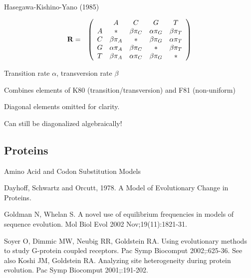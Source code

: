 \documentclass{beamer}
\begin{document}
\begin{frame}{Hasegawa-Kishino-Yano (1985)}

\begin{eqnarray*}
{\bf R} & = & \left( \begin{array}{ccccc}
& A & C & G & T \\
A & \ast & \beta \pi_C & \alpha \pi_G & \beta \pi_T \\
C & \beta \pi_A & \ast & \beta \pi_G & \alpha \pi_T \\
G & \alpha \pi_A & \beta \pi_C & \ast & \beta \pi_T \\
T & \beta \pi_A & \alpha \pi_C & \beta \pi_G & \ast
\end{array} \right)
\end{eqnarray*}

Transition rate $\alpha$, transversion rate $\beta$

Combines elements of K80 (transition/transversion) and F81 (non-uniform)

Diagonal elements omitted for clarity.

Can still be diagonalized algebraically!

\end{frame}


\subsection{Proteins}

\begin{frame}{Amino Acid and Codon Substitution Models}

\enumb
\item Dayhoff, Schwartz and Orcutt, 1978. A Model of Evolutionary Change in Proteins.
\item Goldman N, Whelan S.  A novel use of equilibrium frequencies in models of sequence evolution.  Mol Biol Evol 2002 Nov;19(11):1821-31.
\item Soyer O, Dimmic MW, Neubig RR, Goldstein RA.  Using evolutionary methods to study G-protein coupled receptors.  Pac Symp Biocomput 2002;:625-36.
See also Koshi JM, Goldstein RA.  Analyzing site heterogeneity during protein evolution.  Pac Symp Biocomput 2001;:191-202.
\enume

\end{frame}
\end{document}
